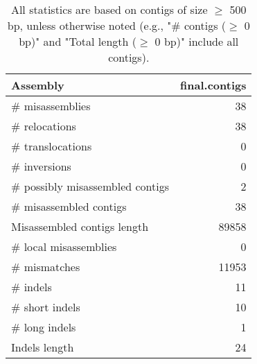 \documentclass[12pt,a4paper]{article}
\begin{document}
\begin{table}[ht]
\begin{center}
\caption{All statistics are based on contigs of size $\geq$ 500 bp, unless otherwise noted (e.g., "\# contigs ($\geq$ 0 bp)" and "Total length ($\geq$ 0 bp)" include all contigs).}
\begin{tabular}{|l*{1}{|r}|}
\hline
Assembly & final.contigs \\ \hline
\# misassemblies & 38 \\ \hline
\hspace{5mm}\# relocations & 38 \\ \hline
\hspace{5mm}\# translocations & 0 \\ \hline
\hspace{5mm}\# inversions & 0 \\ \hline
\# possibly misassembled contigs & 2 \\ \hline
\# misassembled contigs & 38 \\ \hline
Misassembled contigs length & 89858 \\ \hline
\# local misassemblies & 0 \\ \hline
\# mismatches & 11953 \\ \hline
\# indels & 11 \\ \hline
\hspace{5mm}\# short indels & 10 \\ \hline
\hspace{5mm}\# long indels & 1 \\ \hline
Indels length & 24 \\ \hline
\end{tabular}
\end{center}
\end{table}
\end{document}

